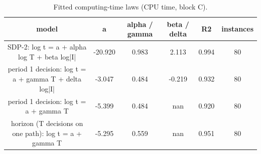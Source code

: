 \begin{table}[H]
\centering
\caption{Fitted computing-time laws (CPU time, block C).}
\label{tab:test2_Q3_fit}
\begin{tabular}{cccccc}
\toprule
model & a & alpha / gamma & beta / delta & R2 & instances \\
\midrule
SDP-2: log t = a + alpha log T + beta log|I| & -20.920 & 0.983 & 2.113 & 0.994 & 80 \\
period 1 decision: log t = a + gamma T + delta log|I| & -3.047 & 0.484 & -0.219 & 0.932 & 80 \\
period 1 decision: log t = a + gamma T & -5.399 & 0.484 & nan & 0.920 & 80 \\
horizon (T decisions on one path): log t = a + gamma T & -5.295 & 0.559 & nan & 0.951 & 80 \\
\bottomrule
\end{tabular}
\end{table}